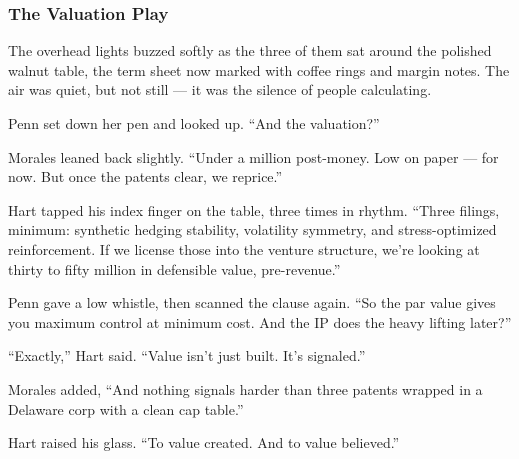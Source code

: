 \subsubsection{The Valuation Play}

The overhead lights buzzed softly as the three of them sat around the polished walnut table, the term sheet now marked with coffee rings and margin notes. The air was quiet, but not still — it was the silence of people calculating.

Penn set down her pen and looked up. ``And the valuation?''

Morales leaned back slightly. ``Under a million post-money. Low on paper — for now. But once the patents clear, we reprice.''

Hart tapped his index finger on the table, three times in rhythm. ``Three filings, minimum: synthetic hedging stability, 
volatility symmetry, and stress-optimized reinforcement. If we license those into the venture structure, we’re looking at 
thirty to fifty million in defensible value, pre-revenue.''

Penn gave a low whistle, then scanned the clause again. ``So the par value gives you maximum control at minimum cost. And 
the IP does the heavy lifting later?''

``Exactly,'' Hart said. ``Value isn’t just built. It’s signaled.''

Morales added, ``And nothing signals harder than three patents wrapped in a Delaware corp with a clean cap table.''

Hart raised his glass. ``To value created. And to value believed.''

\medskip

